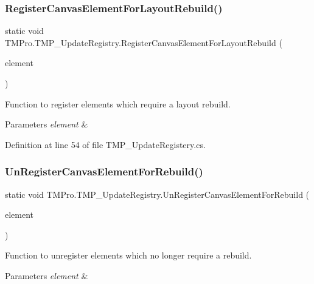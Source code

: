 \subsubsection{\texorpdfstring{RegisterCanvasElementForLayoutRebuild()}{RegisterCanvasElementForLayoutRebuild()}}
{\footnotesize\ttfamily static void T\+M\+Pro.\+T\+M\+P\+\_\+\+Update\+Registry.\+Register\+Canvas\+Element\+For\+Layout\+Rebuild (\begin{DoxyParamCaption}\item[{I\+Canvas\+Element}]{element }\end{DoxyParamCaption})\hspace{0.3cm}{\ttfamily [static]}}



Function to register elements which require a layout rebuild. 


\begin{DoxyParams}{Parameters}
{\em element} & \\
\hline
\end{DoxyParams}


Definition at line 54 of file T\+M\+P\+\_\+\+Update\+Registery.\+cs.

\mbox{\label{class_t_m_pro_1_1_t_m_p___update_registry_abdd464c5a6919c3383c4d8fa19fe60df}} 
\subsubsection{\texorpdfstring{UnRegisterCanvasElementForRebuild()}{UnRegisterCanvasElementForRebuild()}}
{\footnotesize\ttfamily static void T\+M\+Pro.\+T\+M\+P\+\_\+\+Update\+Registry.\+Un\+Register\+Canvas\+Element\+For\+Rebuild (\begin{DoxyParamCaption}\item[{I\+Canvas\+Element}]{element }\end{DoxyParamCaption})\hspace{0.3cm}{\ttfamily [static]}}



Function to unregister elements which no longer require a rebuild. 


\begin{DoxyParams}{Parameters}
{\em element} & \\
\hline
\end{DoxyParams}


